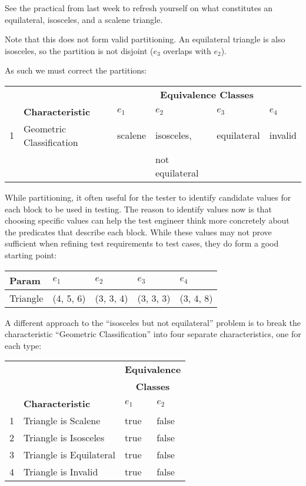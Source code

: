 See the practical from last week to refresh yourself on what constitutes an
equilateral, isosceles, and a scalene triangle.

Note that this does not form valid partitioning. An equilateral triangle is also
isosceles, so the partition is not disjoint ($e_3$ overlaps with $e_2$). 

As such we must correct the partitions:

\begin{center}
\begin{tabular}{rlllll}
    \toprule
    & & \multicolumn{4}{c}{\bf Equivalence Classes} \\
    \cline{3-6}
    & {\bf Characteristic} & $e_1$ & $e_2$ & $e_3$ & $e_4$ \\
    \midrule
    1 & Geometric Classification & scalene & isosceles, & equilateral & invalid \\
    & & & not equilateral & & \\
    \bottomrule    
\end{tabular}
\end{center}

While partitioning, it often useful for the tester to identify candidate values
for each block to be used in testing. The reason to identify values now is that
choosing specific values can help the test engineer think more concretely about
the predicates that describe each block. While these values may not prove
sufficient when refining test requirements to test cases, they do form a good
starting point:

\begin{center}
    \begin{tabular}{lllll}
        \toprule
        {\bf Param} & $e_1$ & $e_2$ & $e_3$ & $e_4$ \\
        \midrule
        Triangle & (4, 5, 6) & (3, 3, 4) & (3, 3, 3) & (3, 4, 8) \\
        \bottomrule    
    \end{tabular}
    \end{center}

A different approach to the ``isosceles but not equilateral'' problem is to
break the characteristic ``Geometric Classification'' into four separate
characteristics, one for each type:

\begin{center}
\begin{tabular}{rlll}
    \toprule
    & & \multicolumn{2}{c}{\bf Equivalence} \\
    & & \multicolumn{2}{c}{\bf Classes} \\
    \cline{3-4}
    & {\bf Characteristic} & $e_1$ & $e_2$ \\
    \midrule
    1 & Triangle is Scalene & true & false \\
    2 & Triangle is Isosceles & true & false \\
    3 & Triangle is Equilateral & true & false \\
    4 & Triangle is Invalid & true & false \\
    \bottomrule    
\end{tabular}
\end{center}

